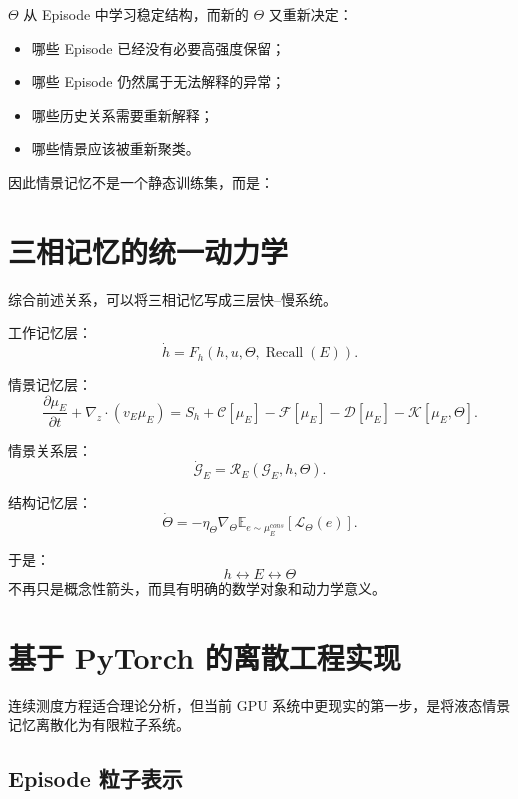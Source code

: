 $\Theta$ 从 Episode 中学习稳定结构，而新的 $\Theta$ 又重新决定：

\begin{itemize}
    \item 哪些 Episode 已经没有必要高强度保留；
    \item 哪些 Episode 仍然属于无法解释的异常；
    \item 哪些历史关系需要重新解释；
    \item 哪些情景应该被重新聚类。
\end{itemize}

因此情景记忆不是一个静态训练集，而是：
\begin{statementbox}
\centering
{}
\end{statementbox}

\section{三相记忆的统一动力学}

综合前述关系，可以将三相记忆写成三层快--慢系统。

工作记忆层：
\[
\boxed{
\dot h
=
F_h
\left(
h,
u,
\Theta,
\operatorname{Recall}(E)
\right).
}
\]

情景记忆层：
\[
\boxed{
\frac{\partial \mu_E}{\partial t}
+
\nabla_z\cdot(v_E\mu_E)
=
S_h
+
\mathcal C[\mu_E]
-
\mathcal F[\mu_E]
-
\mathcal D[\mu_E]
-
\mathcal K[\mu_E,\Theta].
}
\]

情景关系层：
\[
\boxed{
\dot{\mathcal G}_E
=
\mathcal R_E
\left(
\mathcal G_E,
h,
\Theta
\right).
}
\]

结构记忆层：
\[
\boxed{
\dot\Theta
=
-\eta_\Theta
\nabla_\Theta
\mathbb E_{
e\sim\mu_E^{cons}
}
\left[
\mathcal L_\Theta(e)
\right].
}
\]

于是：
\[
\boxed{
h
\leftrightarrow
E
\leftrightarrow
\Theta
}
\]
不再只是概念性箭头，而具有明确的数学对象和动力学意义。

\section{基于 PyTorch 的离散工程实现}

连续测度方程适合理论分析，但当前 GPU 系统中更现实的第一步，是将液态情景记忆离散化为有限粒子系统。

\subsection{Episode 粒子表示}

